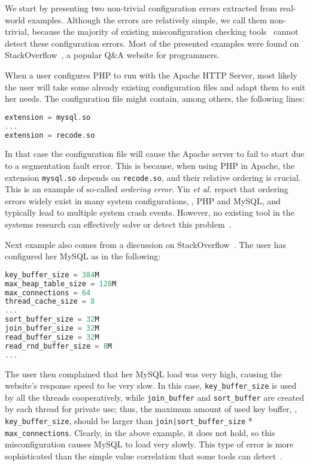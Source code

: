 We start by presenting two non-trivial configuration errors
extracted from real-world examples. 
Although the errors are relatively simple, we call them 
non-trivial, because the majority of existing misconfiguration
checking tools~\cite{zhang14encore, wang04automatic} cannot detect
these configuration errors. 
Most of the presented examples were found on
StackOverflow~\cite{stackoverflow},
a popular Q\&A website for programmers.

When a user configures PHP  to run with the Apache HTTP Server, most 
likely the user will take some already existing configuration files and 
adapt them to suit her needs. The configuration file might contain, among 
others,  the following lines:
\begin{lstlisting}[language=C, xleftmargin=.01\textwidth]
extension = mysql.so
...
extension = recode.so
\end{lstlisting} 
In that case the configuration file will cause the Apache server to 
fail to start due to a segmentation fault error. 
This is because, when using PHP in Apache, the extension {\tt mysql.so} 
depends on {\tt recode.so}, and their relative ordering
is crucial. This is an example of so-called {\em ordering error}.
Yin {\em et al.} report that ordering errors widely exist in
many system configurations, \eg, PHP and MySQL,
and typically lead to multiple system crash events.
However, no existing tool in the systems research can effectively solve 
or detect this problem~\cite{zhang14encore, xu15systems, xu13do}.


Next example also comes from a discussion on 
StackOverflow~\cite{correlation}.
The user has configured her MySQL as in the following:
\begin{lstlisting}[language=C, xleftmargin=.01\textwidth]
key_buffer_size = 384M
max_heap_table_size = 128M
max_connections = 64
thread_cache_size = 8
...
sort_buffer_size = 32M
join_buffer_size = 32M
read_buffer_size = 32M
read_rnd_buffer_size = 8M
...
\end{lstlisting} 
The user then complained that her MySQL load was very high, causing the website's
response speed to be very slow.
In this case, {\tt key\_buffer\_size} is used by all the threads
cooperatively, while {\tt join\_buffer} and {\tt sort\_buffer} are 
created by each thread for private use; thus, the maximum amount
of used key buffer, \ie, {\tt key\_buffer\_size}, should be larger than 
{\tt join|sort\_buffer\_size} * {\tt max\_connections}. 
Clearly, in the above example, it does not hold, 
so this misconfiguration causes MySQL to load very slowly.
This type of error is more sophisticated than the simple value correlation that some tools can detect~\cite{yin11anempirical, zhang14encore}.


